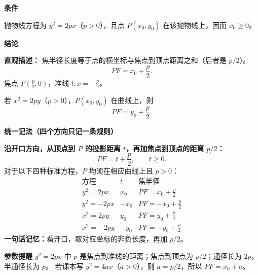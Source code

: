 \begin{statementbox}
  \textbf{\textcolor{CStatement}{条件}}
  \begin{description}[style=nextline, leftmargin=2.8em, labelsep=0.5em, itemsep=0.35em]
    \item[\textbf{\textcolor{CStatement}{条件 1（标准方程与点在曲线上）：}}]
      抛物线方程为 $y^2=2px$（$p>0$），且点 $P(x_0,y_0)$ 在该抛物线上，因而 $x_0\ge 0$。
  \end{description}

  \textbf{\textcolor{CStatement}{结论}}
  \begin{description}[style=nextline, leftmargin=2.8em, labelsep=0.5em, itemsep=0.45em]
    \item[\textbf{\textcolor{CStatement}{结论一（向右开口的焦半径公式）：}}]
      \textbf{\textcolor{CStatement}{直观描述：}}
      焦半径长度等于点的横坐标与焦点到顶点距离之和（后者是 $p/2$）。
      \[
        \boxed{PF=x_0+\frac p2}.
      \]
      焦点 $F(\tfrac p2,0)$，准线 $l:x=-\tfrac p2$。
    \item[\textbf{\textcolor{CStatement}{常见变形（向上开口）：}}]
      若 $x^2=2py$（$p>0$），$P(x_0,y_0)$ 在曲线上，则
      \[
        \boxed{PF=y_0+\frac p2}.
      \]
  \end{description}

  \medskip
  \textbf{\textcolor{CStatement}{统一记法（四个方向只记一条规则）}}

  \textbf{沿开口方向，从顶点到 $P$ 的投影距离 $t$，再加焦点到顶点的距离 $p/2$：}
  \[
    \boxed{PF=t+\frac p2},\qquad t\ge 0.
  \]
  对于以下四种标准方程，$P$ 均须在相应曲线上且 $p>0$：
  \[
    \begin{array}{c|c|c}
      \text{方程}&t&\text{焦半径}\\ \hline
      y^2= 2px& x_0  & PF=x_0+\frac p2\\
      y^2=-2px&-x_0  & PF=-x_0+\frac p2\\
      x^2= 2py& y_0  & PF=y_0+\frac p2\\
      x^2=-2py&-y_0  & PF=-y_0+\frac p2
    \end{array}
  \]
  \textbf{一句话记忆：}看开口，取对应坐标的非负长度，再加 $p/2$。

  \medskip
  \textbf{\textcolor{CStatement}{参数提醒}}
  $y^2=2px$ 中 $p$ 是焦点到准线的距离；焦点到顶点为 $p/2$；通径长为 $2p$，半通径长为 $p$。
  若课本写 $y^2=4ax$（$a>0$），则 $a=p/2$，所以 $PF=x_0+a$。
\end{statementbox}
